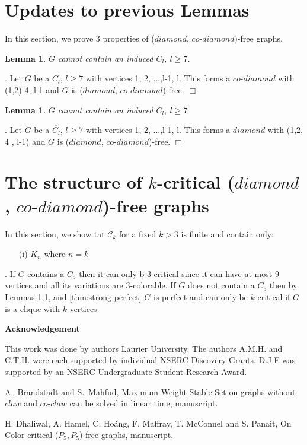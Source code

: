 \documentclass[12pt]{article}
\newtheorem{Lemma}[Theorem]{Lemma}
\def\DCD{($diamond$, $co$-$diamond$)}
\begin{document}
\section{Updates to previous Lemmas}\label{sec:updates}
In this section, we prove 3 properties of {\DCD}-free graphs.
\begin{Lemma}\label{lem:c7-free}
$G$ cannot contain an induced $C_l$, $l \geq 7$.
\end{Lemma}
. Let $G$ be a $C_l$, $l \geq 7$ with vertices 1, 2, ...,l-1, l. This forms a $co$-$diamond$ with (1,2) 4, l-1 and $G$ is {\DCD}-free. $\Box$
\begin{Lemma}\label{lem:co-c7-free}
$G$ cannot contain an induced $\overline{C_l}$, $l \geq 7$
\end{Lemma}
. Let $G$ be a $\overline{C_l}$, $l \geq 7$ with vertices 1, 2, ...,l-1, l. This forms a $diamond$ with (1,2, 4 , l-1) and $G$ is {\DCD}-free. $\Box$

\section{The structure of $k$-critical {\DCD}-free graphs}\label{sec:characterization}
In this section, we show tat $\mathcal{C}_k$ for a fixed $k > 3$ is finite and contain only:
\begin{itemize}
\item[(i)]
$K_n$ where $n = k$
\end{itemize}
. If $G$ contains a $C_5$ then it can only b 3-critical since it can have at most 9 vertices and all its variations are 3-colorable. If $G$ does not contain a $C_5$ then by Lemmas \ref{lem:c7-free},\ref{lem:co-c7-free}, and \ref{thm:strong-perfect} $G$ is perfect and can only be $k$-critical if $G$ is a clique with $k$ vertices

\begin{center}
{\bf Acknowledgement}
\end{center}
This work was done by authors  Laurier University. The authors A.M.H. and C.T.H. were each supported by individual NSERC Discovery Grants. D.J.F was supported by an NSERC Undergraduate Student Research Award.


\clearpage
\begin{thebibliography}{99}

  A.~Brandstadt and S.~Mahfud, Maximum Weight Stable Set on graphs without $claw$ and $co$-$claw$ can be solved in linear time, manuscript.

  H. Dhaliwal, A. Hamel, C. Ho\'{a}ng, F. Maffray, T. McConnel and S. Panait, On Color-critical ($P_5, \overline{P}_5$)-free graphs, manuscript.

\end{thebibliography}
\end{document}
